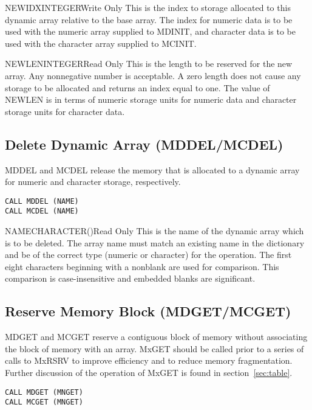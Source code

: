 \begin{argy}{NEWIDX}{INTEGER}{Write Only}
This is the index to storage allocated to this dynamic array relative to
the base array. The index for numeric data is to be used with the numeric
array supplied to MDINIT, and character data is to be used with the
character array supplied to MCINIT.
\end{argy}

\begin{argy}{NEWLEN}{INTEGER}{Read Only}
This is the length to be reserved for the new array. Any nonnegative number
is acceptable.  A zero length does not cause any storage to be allocated and
returns an index equal to one. The value of NEWLEN is in terms of numeric
storage units for numeric data and character storage units for character
data.
\end{argy}

\subsection{Delete Dynamic Array (MDDEL/MCDEL)}
MDDEL and MCDEL release the memory that is allocated to a dynamic array for
numeric and character storage, respectively.
\begin{verbatim}
CALL MDDEL (NAME)
CALL MCDEL (NAME)
\end{verbatim}

\begin{argy}{NAME}{CHARACTER\last(\last)}{Read Only}
This is the name of the dynamic array which is to be deleted.  The array
name must match an existing name in the dictionary and be of the correct
type (numeric or character) for the operation. The first eight characters
beginning with a nonblank are used for comparison.
This comparison is case-insensitive and embedded blanks are
significant.
\end{argy}

\subsection{Reserve Memory Block (MDGET/MCGET)}
MDGET and MCGET reserve a contiguous block of memory without associating the
block of memory with an array.  MxGET should be called prior to a
series of calls to MxRSRV to improve efficiency and to reduce memory
fragmentation.  Further discussion of the operation of MxGET is
found in section~\ref{sec:table}.
\begin{verbatim}
CALL MDGET (MNGET)
CALL MCGET (MNGET)
\end{verbatim}


